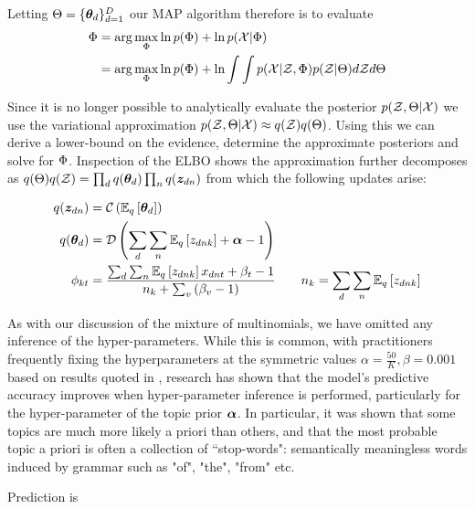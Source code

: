 Letting $\Theta = \{ \thd \}_{d=1}^D$ our MAP algorithm therefore is to evaluate
\begin{align}
\begin{split}
\params 
    &= \arg \max_\params \ln p(\params) + \ln p(\xdat|\params) \\
    &= \arg \max_\params \ln p(\params) + \ln \int \int p(\xdat|\zdat, \Phi)p(\zdat|\Theta) d\zdat d\Theta \label{eqn:vem-lda-problem}
\end{split}
\end{align}

Since it is no longer possible to analytically evaluate the posterior $p(\zdat, \Theta | \xdat)$ we use the variational approximation $p(\zdat, \Theta | \xdat) \approx  q(\zdat)q(\Theta)$. Using this we can derive a lower-bound on the evidence, determine the approximate posteriors and solve for $\params$. Inspection of the ELBO shows the approximation further decomposes as $q(\Theta)q(\zdat) = \prod_d q(\thd)\prod_n q(\zdn)$ from which the following updates arise:

\begin{align}
q(\zdn) & = \cat{\ex{\thd}{q}} \\
q(\thd) &=  \dir{\sum_d \sum_n \ex{\zdnk}{q} + \vv{\alpha} - 1} \\
\phi_{kt} & =
    \frac{
        \sum_d \sum_n \ex{\zdnk}{q}x_{dnt} + \beta_t - 1
    }{
        n_k + \sum_v \left( \beta_v - 1 \right)
    } \qquad n_k = \sum_d \sum_n \ex{z_{dnk}}{q}
\end{align}

As with our discussion of the mixture of multinomials, we have omitted any inference of the hyper-parameters. While this is common, with practitioners frequently fixing the hyperparameters at the symmetric values $\alpha = \frac{50}{K}, \beta=0.001$ based on results quoted in \cite{Griffiths2004}, research has shown\cite{Wallach2009a} that the model's predictive accuracy improves when hyper-parameter inference is performed, particularly for the hyper-parameter of the topic prior $\vv{\alpha}$. In particular, it was shown that some topics are much more likely a priori than others, and that the most probable topic a priori is often a collection of ``stop-words": semantically meaningless words induced by grammar such as "of", "the", "from" etc.

Prediction is


